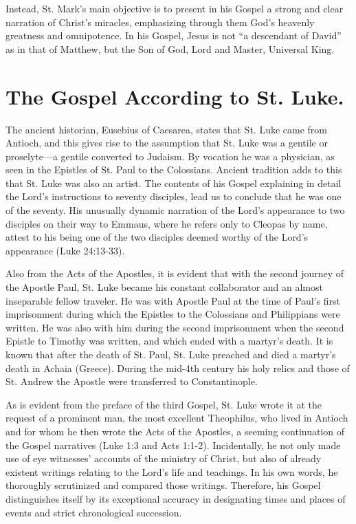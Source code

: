 Instead, St. Mark's main objective is to present in his Gospel a strong and clear narration of Christ's miracles, emphasizing through them God's heavenly greatness and omnipotence. In his Gospel, Jesus is not ``a descendant of David'' as in that of Matthew, but the Son of God, Lord and Master, Universal King.

\section{The Gospel According to St. Luke.}

The ancient historian, Eusebius of Caesarea, states that St. Luke came from Antioch, and this gives rise to the assumption that St. Luke was a gentile or proselyte---a gentile converted to Judaism. By vocation he was a physician, as seen in the Epistles of St. Paul to the Colossians. Ancient tradition adds to this that St. Luke was also an artist. The contents of his Gospel explaining in detail the Lord's instructions to seventy disciples, lead us to conclude that he was one of the seventy. His unusually dynamic narration of the Lord's appearance to two disciples on their way to Emmaus, where he refers only to Cleopas by name, attest to his being one of the two disciples deemed worthy of the Lord's appearance (Luke 24:13-33).

Also from the Acts of the Apostles, it is evident that with the second journey of the Apostle Paul, St. Luke became his constant collaborator and an almost inseparable fellow traveler. He was with Apostle Paul at the time of Paul's first imprisonment during which the Epistles to the Colossians and Philippians were written. He was also with him during the second imprisonment when the second Epistle to Timothy was written, and which ended with a martyr's death. It is known that after the death of St. Paul, St. Luke preached and died a martyr's death in Achaia (Greece). During the mid-4th century his holy relics and those of St. Andrew the Apostle were transferred to Constantinople.

As is evident from the preface of the third Gospel, St. Luke wrote it at the request of a prominent man, the most excellent Theophilus, who lived in Antioch and for whom he then wrote the Acts of the Apostles, a seeming continuation of the Gospel narratives (Luke 1:3 and Acts 1:1-2). Incidentally, he not only made use of eye witnesses' accounts of the ministry of Christ, but also of already existent writings relating to the Lord's life and teachings. In his own words, he thoroughly scrutinized and compared those writings. Therefore, his Gospel distinguishes itself by its exceptional accuracy in designating times and places of events and strict chronological succession.

